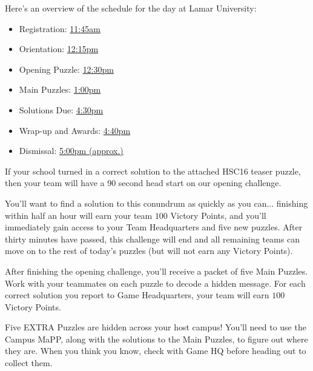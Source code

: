 
\begin{rules}


Here's an overview of the schedule for the day at
Lamar University:

\begin{itemize}
\item Registration: \underline{11:45am}
\item Orientation: \underline{12:15pm}
\item Opening Puzzle: \underline{12:30pm}
\item Main Puzzles: \underline{1:00pm}
\item Solutions Due: \underline{4:30pm}
\item Wrap-up and Awards: \underline{4:40pm}
\item Dismissal: \underline{5:00pm (approx.)}
\end{itemize}

\vfill


If your school turned in a correct solution to the attached HSC16 teaser
puzzle, then your team will have a 90 second head start on our opening
challenge.

You'll want to find a solution to this conundrum as quickly as you can...
finishing within half an hour will earn your team
\(100\) Victory Points, and you'll immediately gain access to your Team Headquarters
and five new puzzles. After thirty minutes have passed, this challenge will end
and all remaining teams can move on to the rest of today's puzzles (but
will not earn any Victory Points).

\vfill


After finishing the opening challenge, you'll receive a packet of
five Main Puzzles. Work
with your teammates on each puzzle to decode a hidden message. For each
correct solution you report to Game Headquarters, your team will earn \(100\)
Victory Points.

\vfill

\newpage


Five EXTRA Puzzles are hidden across your host campus! You'll need to
use the Campus MaPP, along with the solutions to the Main Puzzles, to
figure out where they are. When you think you know, check with Game HQ before
heading out to collect them.


\end{rules}

